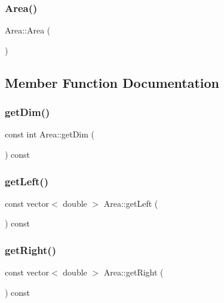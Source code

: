 \mbox{\label{class_area_aa92851fcffb0a9f1c6c8c283204f7003}} 
\subsubsection{\texorpdfstring{Area()}{Area()}\hspace{0.1cm}{\footnotesize\ttfamily [2/2]}}
{\footnotesize\ttfamily Area\+::\+Area (\begin{DoxyParamCaption}{ }\end{DoxyParamCaption})\hspace{0.3cm}{\ttfamily [inline]}}



\subsection{Member Function Documentation}
\mbox{\label{class_area_a3f323d5ea2bb19a1a48e9462a9542ff4}} 
\subsubsection{\texorpdfstring{get\+Dim()}{getDim()}}
{\footnotesize\ttfamily const int Area\+::get\+Dim (\begin{DoxyParamCaption}{ }\end{DoxyParamCaption}) const}

\mbox{\label{class_area_a785a940f36dc9fcecde27c7ccf11f297}} 
\subsubsection{\texorpdfstring{get\+Left()}{getLeft()}}
{\footnotesize\ttfamily const vector$<$ double $>$ Area\+::get\+Left (\begin{DoxyParamCaption}{ }\end{DoxyParamCaption}) const}

\mbox{\label{class_area_a9579ee04ce26f73eb35be4a03037972b}} 
\subsubsection{\texorpdfstring{get\+Right()}{getRight()}}
{\footnotesize\ttfamily const vector$<$ double $>$ Area\+::get\+Right (\begin{DoxyParamCaption}{ }\end{DoxyParamCaption}) const}

